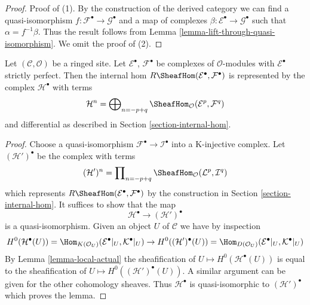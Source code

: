 \begin{proof}
Proof of (1).
By the construction of the derived category we can find a quasi-isomorphism
$f : \mathcal{F}^\bullet \to \mathcal{G}^\bullet$ and a map of complexes
$\beta : \mathcal{E}^\bullet \to \mathcal{G}^\bullet$ such that
$\alpha = f^{-1}\beta$. Thus the result follows from
Lemma \ref{lemma-lift-through-quasi-isomorphism}.
We omit the proof of (2).
\end{proof}

\begin{lemma}
\label{lemma-Rhom-strictly-perfect}
Let $(\mathcal{C}, \mathcal{O})$ be a ringed site.
Let $\mathcal{E}^\bullet$, $\mathcal{F}^\bullet$ be complexes
of $\mathcal{O}$-modules with $\mathcal{E}^\bullet$ strictly perfect.
Then the internal hom $R\SheafHom(\mathcal{E}^\bullet, \mathcal{F}^\bullet)$
is represented by the complex $\mathcal{H}^\bullet$ with terms
$$
\mathcal{H}^n =
\bigoplus\nolimits_{n = - p + q}
\SheafHom_\mathcal{O}(\mathcal{E}^p, \mathcal{F}^q)
$$
and differential as described in Section \ref{section-internal-hom}.
\end{lemma}

\begin{proof}
Choose a quasi-isomorphism $\mathcal{F}^\bullet \to \mathcal{I}^\bullet$
into a K-injective complex. Let $(\mathcal{H}')^\bullet$ be the
complex with terms
$$
(\mathcal{H}')^n =
\prod\nolimits_{n = - p + q}
\SheafHom_\mathcal{O}(\mathcal{L}^p, \mathcal{I}^q)
$$
which represents $R\SheafHom(\mathcal{E}^\bullet, \mathcal{F}^\bullet)$
by the construction in Section \ref{section-internal-hom}. It suffices
to show that the map
$$
\mathcal{H}^\bullet \longrightarrow (\mathcal{H}')^\bullet
$$
is a quasi-isomorphism. Given an object $U$ of $\mathcal{C}$ we have
by inspection
$$
H^0(\mathcal{H}^\bullet(U)) =
\Hom_{K(\mathcal{O}_U)}(\mathcal{E}^\bullet|_U, \mathcal{K}^\bullet|_U)
\to
H^0((\mathcal{H}')^\bullet(U)) =
\Hom_{D(\mathcal{O}_U)}(\mathcal{E}^\bullet|_U, \mathcal{K}^\bullet|_U)
$$
By Lemma \ref{lemma-local-actual} the sheafification of
$U \mapsto H^0(\mathcal{H}^\bullet(U))$
is equal to the sheafification of
$U \mapsto H^0((\mathcal{H}')^\bullet(U))$. A similar argument can be
given for the other cohomology sheaves. Thus $\mathcal{H}^\bullet$
is quasi-isomorphic to $(\mathcal{H}')^\bullet$ which proves the lemma.
\end{proof}

